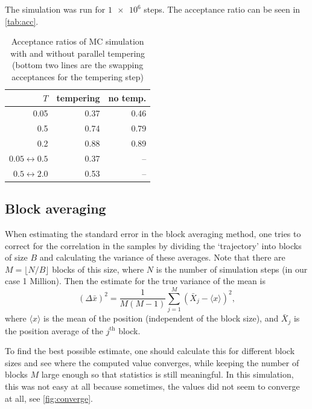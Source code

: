 \documentclass[11pt]{article}
\newcommand{\super}[1]{^{\text{#1}}}
\begin{document}
The simulation was run for $\num{1e6}$ steps. The acceptance ratio can be seen in \autoref{tab:acc}.

\begin{table}
	\centering
		\caption{Acceptance ratios of MC simulation with and without parallel tempering (bottom two lines are the swapping acceptances for the tempering step)}
	\label{tab:acc}
	\begin{tabular}{r r r}\hline\hline
		$T$ & tempering & no temp.\\\hline
		0.05 & 0.37 & 0.46\\
		0.5 & 0.74 & 0.79\\
		0.2 & 0.88 & 0.89\\\hline
		$0.05 \leftrightarrow 0.5$ & 0.37 & -- \\
		$0.5 \leftrightarrow 2.0$ & 0.53 & --\\\hline\hline
	\end{tabular}

\end{table}

\subsection{Block averaging}

When estimating the standard error in the block averaging method, one tries to correct for the correlation in the samples by dividing the `trajectory' into blocks of size $B$ and calculating the variance of these averages. Note that there are $M = \lfloor N / B\rfloor$ blocks of this size, where $N$ is the number of simulation steps (in our case 1 Million).
Then the estimate for the true variance of the mean is
\begin{equation}
	(\Delta\bar x)^2 = \frac{1}{M(M-1)}\sum_{j=1}^M (\bar X_j - \langle x\rangle)^2,
\end{equation}
where $\langle x\rangle$ is the mean of the position (independent of the block size), and $\bar X_j$ is the position average of the $j\super{th}$ block.

To find the best possible estimate, one should calculate this for different block sizes and see where the computed value converges, while keeping the number of blocks $M$ large enough so that statistics is still meaningful.
In this simulation, this was not easy at all because sometimes, the values did not seem to converge at all, see \autoref{fig:converge}.
\end{document}

